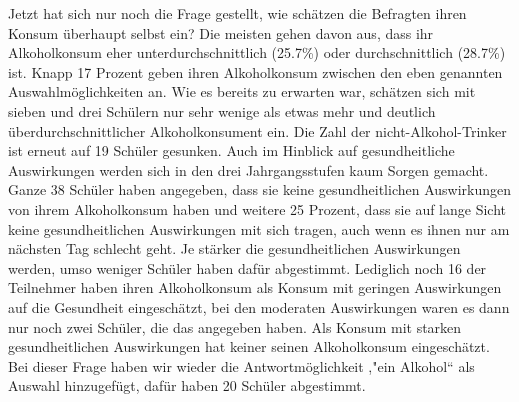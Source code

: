 \documentclass[12pt]{article}
\begin{document}
Jetzt hat sich nur noch die Frage gestellt, wie schätzen die Befragten ihren Konsum überhaupt selbst ein? Die meisten gehen davon aus, dass ihr Alkoholkonsum eher unterdurchschnittlich (25.7\%) oder durchschnittlich (28.7\%) ist. Knapp 17 Prozent geben ihren Alkoholkonsum zwischen den eben genannten Auswahlmöglichkeiten an. Wie es bereits zu erwarten war, schätzen sich mit sieben und drei Schülern nur sehr wenige als etwas mehr und deutlich überdurchschnittlicher Alkoholkonsument ein. Die Zahl der nicht-Alkohol-Trinker ist erneut auf 19 Schüler gesunken. Auch im Hinblick auf gesundheitliche Auswirkungen werden sich in den drei Jahrgangsstufen kaum Sorgen gemacht. Ganze 38 Schüler haben angegeben, dass sie keine gesundheitlichen Auswirkungen von ihrem Alkoholkonsum haben und weitere 25 Prozent, dass sie auf lange Sicht keine gesundheitlichen Auswirkungen mit sich tragen, auch wenn es ihnen nur am nächsten Tag schlecht geht. Je stärker die gesundheitlichen Auswirkungen werden, umso weniger Schüler haben dafür abgestimmt. Lediglich noch 16 der Teilnehmer haben ihren Alkoholkonsum als Konsum mit geringen Auswirkungen auf die Gesundheit eingeschätzt, bei den moderaten Auswirkungen waren es dann nur noch zwei Schüler, die das angegeben haben. Als Konsum mit starken gesundheitlichen Auswirkungen hat keiner seinen Alkoholkonsum eingeschätzt. Bei dieser Frage haben wir wieder die Antwortmöglichkeit ,"ein Alkohol“ als Auswahl hinzugefügt, dafür haben 20 Schüler abgestimmt. 
\end{document}
